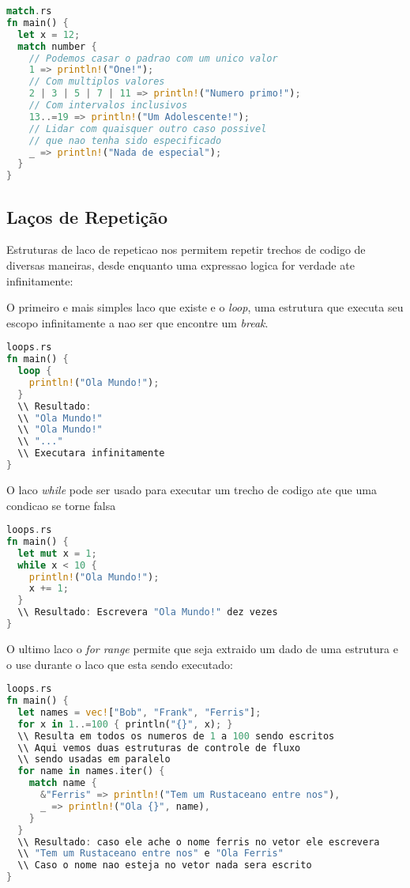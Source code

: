 \begin{lstlisting}[language=rust]
match.rs
fn main() {
  let x = 12;
  match number {
    // Podemos casar o padrao com um unico valor
    1 => println!("One!");
    // Com multiplos valores
    2 | 3 | 5 | 7 | 11 => println!("Numero primo!");
    // Com intervalos inclusivos
    13..=19 => println!("Um Adolescente!");
    // Lidar com quaisquer outro caso possivel
    // que nao tenha sido especificado
    _ => println!("Nada de especial");
  }
}
\end{lstlisting}

\subsection{La\c{c}os de Repeti\c{c}\~{a}o}

Estruturas de laco de repeticao nos permitem repetir trechos de codigo de diversas maneiras, desde enquanto uma expressao logica for verdade ate infinitamente:
\par
O primeiro e mais simples laco que existe e o \textit{loop}, uma estrutura que executa seu escopo infinitamente a nao ser que encontre um \textit{break}.
\begin{lstlisting}[language=rust]
loops.rs
fn main() {
  loop {
    println!("Ola Mundo!");
  }
  \\ Resultado:
  \\ "Ola Mundo!"
  \\ "Ola Mundo!"
  \\ "..."
  \\ Executara infinitamente
}
\end{lstlisting}
O laco \textit{while} pode ser usado para executar um trecho de codigo ate que uma condicao se torne falsa
\begin{lstlisting}[language=rust]
loops.rs
fn main() {
  let mut x = 1;
  while x < 10 {
    println!("Ola Mundo!");
    x += 1;
  }
  \\ Resultado: Escrevera "Ola Mundo!" dez vezes
}
\end{lstlisting}
O ultimo laco o \textit{for range} permite que seja extraido um dado de uma estrutura e o use durante o laco que esta sendo executado:
\begin{lstlisting}[language=rust]
loops.rs
fn main() {
  let names = vec!["Bob", "Frank", "Ferris"];
  for x in 1..=100 { println("{}", x); }
  \\ Resulta em todos os numeros de 1 a 100 sendo escritos
  \\ Aqui vemos duas estruturas de controle de fluxo 
  \\ sendo usadas em paralelo
  for name in names.iter() {
    match name {
      &"Ferris" => println!("Tem um Rustaceano entre nos"),
      _ => println!("Ola {}", name),
    }
  }
  \\ Resultado: caso ele ache o nome ferris no vetor ele escrevera
  \\ "Tem um Rustaceano entre nos" e "Ola Ferris"
  \\ Caso o nome nao esteja no vetor nada sera escrito
}
\end{lstlisting}

